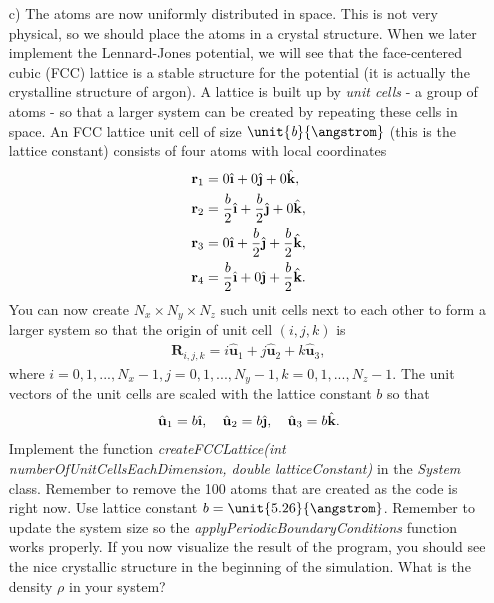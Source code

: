 \documentclass[11pt,a4wide]{article}
\renewcommand{\vec}{\mathbf}
\newcommand{\ihat}{\hat{\textbf{\i}}}
\newcommand{\jhat}{\hat{\textbf{\j}}}
\newcommand{\khat}{\hat{\textbf{k}}}
\begin{document}
\begin{enumerate}
\item[c)] 
The atoms are now uniformly distributed in space. This is not very physical, so we should place the atoms in a crystal structure. When we later implement the Lennard-Jones potential, we will see that the face-centered cubic (FCC) lattice is a stable structure for the potential (it is actually the crystalline structure of argon). A lattice is built up by \textit{unit cells} - a group of atoms - so that a larger system can be created by repeating these cells in space. An FCC lattice unit cell of size $\unit{\textit{b}}{\angstrom}$ (this is the lattice constant) consists of four atoms with local coordinates
\begin{align}
	\vec r_1 &= 0 \ihat + 0 \jhat + 0 \khat,\\
	\vec r_2 &= \frac{b}{2} \ihat + \frac{b}{2} \jhat + 0 \khat,\\
	\vec r_3 &= 0 \ihat + \frac{b}{2} \jhat + \frac{b}{2} \khat,\\
	\vec r_4 &= \frac{b}{2} \ihat + 0 \jhat + \frac{b}{2} \khat.
\end{align}
You can now create $N_x \times N_y \times N_z$ such unit cells next to each other to form a larger system so that the origin of unit cell $(i,j,k)$ is
\begin{align}
	\vec R_{i,j,k} = i \hat{\textbf{u}}_1 + j \hat{\textbf{u}}_2 + k \hat{\textbf{u}}_3,
\end{align}
where $i=0,1,..., N_x-1, j=0,1,..., N_y-1, k=0,1,..., N_z-1$. The unit vectors of the unit cells are scaled with the lattice constant $b$ so that
\begin{align}
	\hat{\textbf{u}}_1 = b\ihat, \quad \hat{\textbf{u}}_2 = b\jhat, \quad \hat{\textbf{u}}_3 = b\khat.
\end{align}
Implement the function \textit{createFCCLattice(int numberOfUnitCellsEachDimension, double latticeConstant)} in the \textit{System} class. Remember to remove the 100 atoms that are created as the code is right now. Use lattice constant $b=\unit{5.26}{\angstrom}$. Remember to update the system size so the \textit{applyPeriodicBoundaryConditions} function works properly. If you now visualize the result of the program, you should see the nice crystallic structure in the beginning of the simulation. What is the density $\rho$ in your system?


\end{enumerate}
\end{document}
